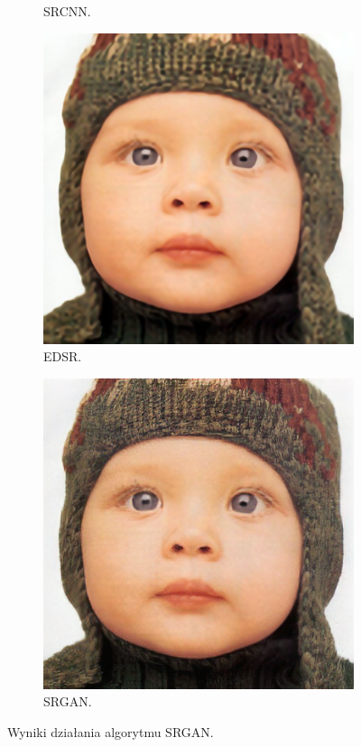 \documentclass[a4paper,11pt, notitlepage ]{article}
\begin{document}
\begin{figure}[h!]
\begin{subfigure}[b]{0.4\linewidth}
		\caption{SRCNN.}
	\end{subfigure}
	\begin{subfigure}[b]{0.4\linewidth}
		\includegraphics[width=\linewidth]{EDSR/EDSR_OUTPUT.png}
		\caption{EDSR.}
	\end{subfigure}
	\begin{subfigure}[b]{0.4\linewidth}
		\includegraphics[width=\linewidth]{SRGAN/output_SRGAN.png}
		\caption{SRGAN.}
	\end{subfigure}
	\caption{Wyniki działania algorytmu SRGAN.}
	\label{fig:coffee3}
\end{figure}
\end{document}
